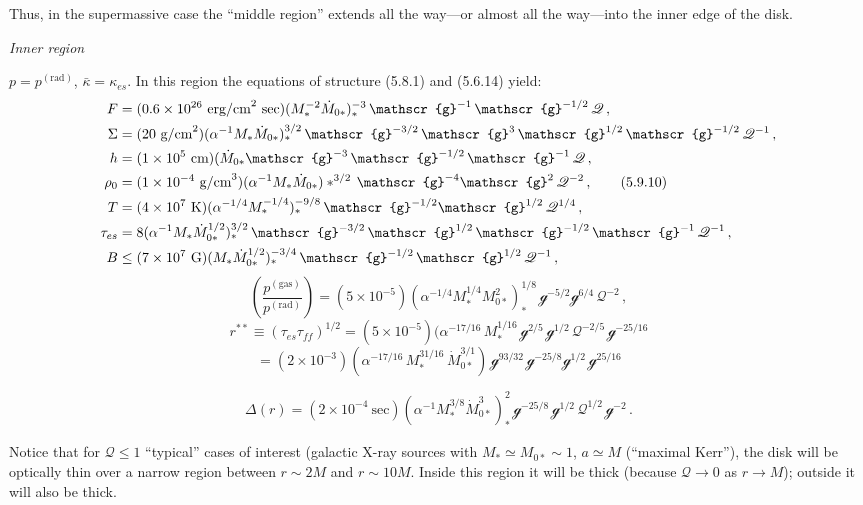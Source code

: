 Thus, in the supermassive case the ``middle region'' extends all the way---or
almost all the way---into the inner edge of the disk.

\medskip
\noindent
\textit{Inner region}

\noindent
$p = p^{(\text{rad})}$, $\bar{\kappa} = \kappa_{es}$.  In this region the equations of structure (5.8.1) and (5.6.14)
yield:
%
\begin{align}
F &= (0.6 \times 10^{26}~\text{erg/cm}^2~\text{sec})(M_*^{-2} \dot{M}_{0*})_*^{-3}\,\mathscr{g}^{-1}\,\mathscr{g}^{-1/2}\,\mathscr{Q}\,,
\notag\\
\Sigma &= (20~\text{g/cm}^2)(\alpha^{-1}M_*\dot{M}_{0*})_*^{3/2}\,\mathscr{g}^{-3/2}\,\mathscr{g}^{3}\,\mathscr{g}^{1/2}\,\mathscr{g}^{-1/2}\,\mathscr{Q}^{-1}\,,
\notag\\
h &= (1 \times 10^5~\text{cm})(\dot{M}_{0*}\mathscr{g}^{-3}\,\mathscr{g}^{-1/2}\,\mathscr{g}^{-1}\,\mathscr{Q}\,,
\notag\\
\rho_0 &= (1 \times 10^{-4}~\text{g/cm}^3)(\alpha^{-1}M_*\dot{M}_{0*})*^{3/2}\,\mathscr{g}^{-4}\mathscr{g}^{2}\,\mathscr{Q}^{-2}\,,
\tag{5.9.10}\\
T &= (4 \times 10^7~\text{K})(\alpha^{-1/4}M_*^{-1/4})_*^{-9/8}\,\mathscr{g}^{-1/2}\mathscr{g}^{1/2}\,\mathscr{Q}^{1/4}\,,
\notag\\
\tau_{es} &= 8(\alpha^{-1}M_*\dot{M}_{0*}^{1/2})_*^{3/2}\,\mathscr{g}^{-3/2}\,\mathscr{g}^{1/2}\,\mathscr{g}^{-1/2}\,\mathscr{g}^{-1}\,\mathscr{Q}^{-1}\,,
\notag\\
B &\leq (7 \times 10^7~\text{G})(M_*\dot{M}_{0*}^{1/2})_*^{-3/4}\,\mathscr{g}^{-1/2}\,\mathscr{g}^{1/2}\,\mathscr{Q}^{-1}\,,
\notag
\end{align}
%
\[
\left(\frac{p^{(\text{gas})}}{p^{(\text{rad})}}\right)
= (5 \times 10^{-5})(\alpha^{-1/4}M_*^{1/4}M_{0*}^{2})_*^{1/8}\,\mathscr{g}^{-5/2}\mathscr{g}^{6/4}\,\mathscr{Q}^{-2}\,,
\]
%
\[
r^{**} \equiv (\tau_{es}\tau_{ff})^{1/2}
= (5 \times 10^{-5})(\alpha^{-17/16}\,M_*^{1/16}\,\mathscr{g}^{2/5}\,\mathscr{g}^{1/2}\,\mathscr{Q}^{-2/5}\,\mathscr{g}^{-25/16}
\]
%
\[
= (2 \times 10^{-3})(\alpha^{-17/16}\,M_*^{31/16}\,\dot{M}_{0*}^{3/1})
\,\mathscr{g}^{93/32}\,\mathscr{g}^{-25/8}\mathscr{g}^{1/2}\,\mathscr{g}^{25/16}
\]

\[
\Delta(r) = (2 \times 10^{-4}~\text{sec})(\alpha^{-1}M_*^{3/8}\dot{M}_{0*}^{3})_*^{2}\,\mathscr{g}^{-25/8}\,\mathscr{g}^{1/2}\,\mathscr{Q}^{1/2}\,\mathscr{g}^{-2}\,.
\]

Notice that for $\mathscr{Q} \leq 1$ ``typical'' cases of interest (galactic X-ray sources with
$M_* \simeq M_{0*} \sim 1$, $a \simeq M$ (``maximal
Kerr''), the disk will be optically thin over a narrow region between $r \sim 2M$ and
$r \sim 10M$.  Inside this region it will be thick (because $\mathscr{Q} \to 0$ as $r \to M$); outside it
will also be thick.

